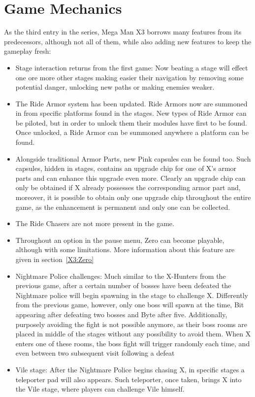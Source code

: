 \section{Game Mechanics}
As the third entry in the series, Mega Man X3 borrows many features from its predecessors, although not all of them, while also adding new features to keep the gameplay fresh:
\begin{itemize}
	\item Stage interaction returns from the first game: Now beating a stage will effect one ore more other stages making easier their navigation by removing some potential danger, unlocking new paths or making enemies weaker.
	\item The Ride Armor system has been updated. Ride Armors now are summoned in from specific platforms found in the stages. New types of Ride Armor can be piloted, but in order to unlock them their modules have first to be found. Once unlocked, a Ride Armor can be summoned anywhere a platform can be found.
	\item Alongside traditional Armor Parts, new Pink capsules can be found too. Such capsules, hidden in stages, contains an upgrade chip for one of X's armor parts and can enhance this upgrade even more. Clearly an upgrade chip can only be obtained if X already possesses the corresponding armor part and, moreover, it is possible to obtain only one upgrade chip throughout the entire game, as the enhancement is permanent and only one can be collected.
	\item The Ride Chasers are not more present in the game.
	\item Throughout an option in the pause menu, Zero can become playable, although with some limitations. More information about this feature are given in section~\ref{X3:Zero}
	\item Nightmare Police challenges: Much similar to the X-Hunters from the previous game, after a certain number of bosses have been defeated the Nightmare police will begin spawning in the stage to challenge X. Differently from the previous game, however, only one boss will spawn at the time, Bit appearing after defeating two bosses and Byte after five. Additionally, purposely avoiding the fight is not possible anymore, as their boss rooms are placed in middle of the stages without any possibility to avoid them. When X enters one of these rooms, the boss fight will trigger randomly each time, and even between two subsequent visit following a defeat
	\item Vile stage: After the Nightmare Police begins chasing X, in specific stages a teleporter pad will also appears. Such teleporter, once taken, brings X into the Vile stage, where players can challenge Vile himself.
\end{itemize}
